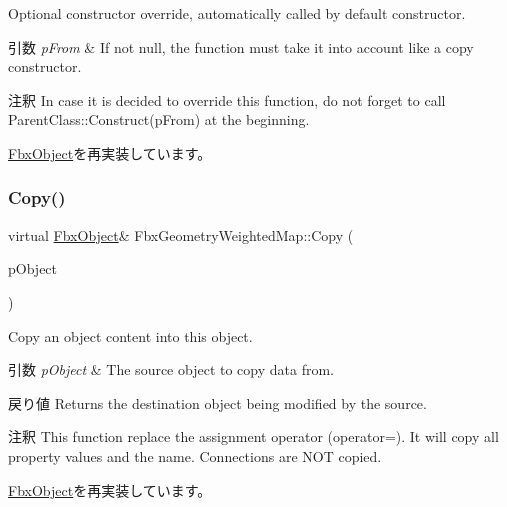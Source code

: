 Optional constructor override, automatically called by default constructor. 
\begin{DoxyParams}{引数}
{\em p\+From} & If not null, the function must take it into account like a copy constructor. \\
\hline
\end{DoxyParams}
\begin{DoxyRemark}{注釈}
In case it is decided to override this function, do not forget to call Parent\+Class\+::\+Construct(p\+From) at the beginning. 
\end{DoxyRemark}


\hyperlink{class_fbx_object_a313503bc645af3fdceb4a99ef5cea7eb}{Fbx\+Object}を再実装しています。

\mbox{\label{class_fbx_geometry_weighted_map_aa0310025b01de1d69b9f313a886df3c0}} 
\subsubsection{\texorpdfstring{Copy()}{Copy()}}
{\footnotesize\ttfamily virtual \hyperlink{class_fbx_object}{Fbx\+Object}\& Fbx\+Geometry\+Weighted\+Map\+::\+Copy (\begin{DoxyParamCaption}\item[{const \hyperlink{class_fbx_object}{Fbx\+Object} \&}]{p\+Object }\end{DoxyParamCaption})\hspace{0.3cm}{\ttfamily [virtual]}}

Copy an object content into this object. 
\begin{DoxyParams}{引数}
{\em p\+Object} & The source object to copy data from. \\
\hline
\end{DoxyParams}
\begin{DoxyReturn}{戻り値}
Returns the destination object being modified by the source. 
\end{DoxyReturn}
\begin{DoxyRemark}{注釈}
This function replace the assignment operator (operator=). It will copy all property values and the name. Connections are N\+OT copied. 
\end{DoxyRemark}


\hyperlink{class_fbx_object_a0c0c5adb38284d14bb82c04d54504a3e}{Fbx\+Object}を再実装しています。

